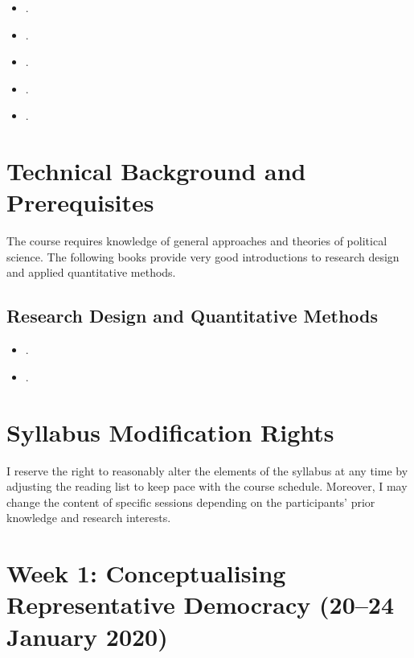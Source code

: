 \documentclass[abstract=on,parskip=full,headings=standardclasses,fontsize=11pt,paper=a4]{scrartcl}
\begin{document}
\begin{itemize}
\item {}.
\item {}.
\item {}.
\item {}.
\item {}.
\end{itemize}




\section*{Technical Background and Prerequisites}

The course requires knowledge of general approaches and theories of political science. The following books provide very good introductions to research design and applied quantitative methods.

\subsection*{Research Design and Quantitative Methods}
\begin{itemize}
\item {}.
\item {}.
\end{itemize}


\section*{Syllabus Modification Rights}

I reserve the right to reasonably alter the elements of the syllabus at any time by adjusting the reading list to keep pace with the course schedule. Moreover, I may change the content of specific sessions depending on the participants' prior knowledge and research interests.



\newpage

\tableofcontents

\section{Week 1: Conceptualising Representative Democracy (20--24 January 2020)}
\end{document}
